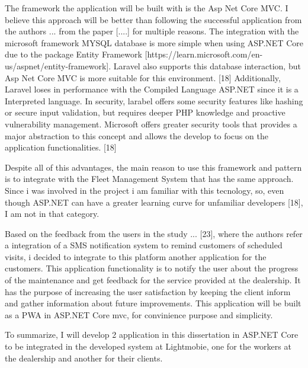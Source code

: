 The framework the application will be built with is the Asp Net Core MVC. 
I believe this approach will be better than following the successful application from the authors ... from the paper [....] for multiple reasons.
The integration with the microsoft framework MYSQL database is more simple when using ASP.NET Core due to the package Entity Framework [https://learn.microsoft.com/en-us/aspnet/entity-framework]. 
Laravel also supports this database interaction, but Asp Net Core MVC is more suitable for this environment. [18]
Additionally, Laravel loses in performance with the Compiled Language ASP.NET since it is a Interpreted language. 
In security, larabel offers some security features like hashing or secure input validation, but requires deeper PHP knowledge and proactive vulnerability management. 
Microsoft offers greater security tools that provides a major abstraction to this concept and allows the develop to focus on the application functionalities. [18]

Despite all of this advantages, the main reason to use this framework and pattern is to integrate with the Fleet Management System that has the same approach. 
Since i was involved in the project i am familiar with this tecnology, so, even though ASP.NET can have a greater learning curve for unfamiliar developers [18], I am not in that category.

Based on the feedback from the users in the study ... [23], where the authors refer a integration of a SMS notification system to remind customers of scheduled visits, i decided to integrate to this platform another application for the customers. 
This application functionality is to notify the user about the progress of the maintenance and get feedback for the service provided at the dealership.
It has the purpose of increasing the user satisfaction by keeping the client inform and gather information about future improvements.
This application will be built as a \ac{PWA} in ASP.NET Core mvc, for convinience purpose and simplicity.

To summarize, I will develop 2 application in this dissertation in ASP.NET Core to be integrated in the developed system at Lightmobie, one for the workers at the dealership and another for their clients.







